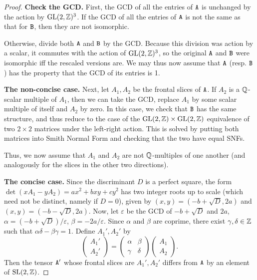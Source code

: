 \begin{proof}
\textbf{Check the GCD.} First, the GCD of all the entries of $\mathtt{A}$ is unchanged by the action by $\mathrm{GL}(2,\mathbb{Z})^3$. If the GCD of all the entries of $\mathtt{A}$ is not the same as that for $\mathtt{B}$, then they are not isomorphic.

Otherwise, divide both $\mathtt{A}$ and $\mathtt{B}$ by the GCD. Because this division was action by a scalar, it commutes with the action of $\mathrm{GL}(2,\mathbb{Z})^3$, so the original $\mathtt{A}$ and $\mathtt{B}$ were isomorphic iff the rescaled versions are. We may thus now assume that $\mathtt{A}$ (resp. $\mathtt{B}$) has the property that the GCD of its entries is 1.

\textbf{The non-concise case.} Next, let $A_1, A_2$ be the frontal slices of $\mathtt{A}$. If $A_2$ is a $\mathbb{Q}$-scalar multiple of $A_1$, then we can take the GCD, replace $A_1$ by some scalar multiple of itself and $A_2$ by zero. In this case, we check that $\mathtt{B}$ has the same structure, and thus reduce to the case of the $\mathrm{GL}(2,\mathbb{Z}) \times \mathrm{GL}(2,\mathbb{Z})$ equivalence of two $2 \times 2$ matrices under the left-right action. This is solved by putting both matrices into Smith Normal Form and checking that the two have equal SNFs.

Thus, we now assume that $A_1$ and $A_2$ are not $\mathbb{Q}$-multiples of one another (and analogously for the slices in the other two directions).

\textbf{The concise case.} Since the discriminant $D$ is a perfect square, the form $\det(x A_1 - y A_2) = ax^2 + bxy + cy^2$ has two integer roots up to scale (which need not be distinct, namely if $D=0$), given by $(x,y) = (-b + \sqrt{D}, 2a)$ and $(x,y) = (-b - \sqrt{D}, 2a)$. Now, let $\varepsilon$ be the GCD of $-b + \sqrt{D}$ and $2a$, $\alpha = (-b + \sqrt{D})/\varepsilon$, $\beta = -2a / \varepsilon$. Since $\alpha$ and $\beta$ are coprime, there exist $\gamma,\delta \in \mathbb{Z}$ such that $\alpha \delta - \beta \gamma = 1$. Define $A_1', A_2'$ by
\[
\begin{pmatrix}
A_1' \\
A_2'
\end{pmatrix}
=
\begin{pmatrix}
\alpha & \beta \\
\gamma & \delta
\end{pmatrix}
\begin{pmatrix}
A_1 \\
A_2
\end{pmatrix}.
\]
Then the tensor $\mathtt{A}'$ whose frontal slices are $A_1',A_2'$ differs from $\mathtt{A}$ by an element of $\mathrm{SL}(2,\mathbb{Z})$. 


\end{proof}
